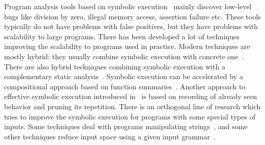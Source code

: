 \documentclass[10pt]{llncs}
\begin{document}
Program analysis tools based on symbolic execution~\cite{se} mainly discover
low-level bugs like division by zero, illegal memory access, assertion
failure etc. These tools typically do not have problems with false
positives, but they have problems with scalability to large programs. There
has been developed a lot of techniques improving the scalability to programs
used in practice. Modern techniques are mostly hybrid: they usually combine
symbolic execution with concrete
one~\cite{PKS05,GLM08:active_props,SMA05}. %
There are also hybrid techniques combining symbolic execution with a
complementary static
analysis~\cite{GNRT10,NRTT09}. %
Symbolic execution can be accelerated by a compositional approach based on
function summaries~\cite{AGT08,G07}. Another approach to effective symbolic
execution introduced in~\cite{BCE08,klee,Cadar08} is based on recording of
already seen behavior and pruning its repetition.
There is an orthogonal line of research which tries to improve the symbolic
execution for programs with some special types of inputs. Some techniques
deal with programs manipulating strings~\cite{BTV09,XGM08}, and some other
techniques reduce input space using a given input
grammar~\cite{GKL08,SPmCS09}.
\end{document}
